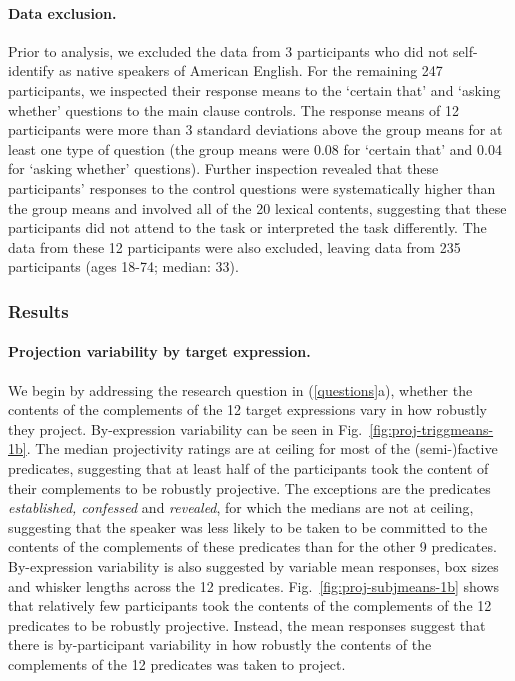 \documentclass[11pt,fleqn]{article}
\newcommand{\6}{\mbox{$[\hspace*{-.6mm}[$}}
\newcommand{\9}{\mbox{$]\hspace*{-.6mm}]$}}
\newcommand{\figref}[1]{Fig.~\ref{#1}}
\begin{document}
\paragraph{Data exclusion.} Prior to analysis, we excluded the data from 3 participants who did not self-identify as native speakers of American English. For the remaining 247 participants, we inspected their response means to the `certain that' and `asking whether' questions to the main clause controls. The response means of 12 participants were more than 3 standard deviations above the group means for at least one type of question (the group means were 0.08 for `certain that' and 0.04 for `asking whether' questions). Further inspection revealed that these participants' responses to the control questions were systematically higher than the group means and involved all of the 20 lexical contents, suggesting that these participants did not attend to the task or interpreted the task differently. The data from these 12 participants were also excluded, leaving data from 235 participants (ages 18-74; median: 33).

\subsubsection{Results}

\paragraph{Projection variability by target expression.} We begin by addressing the research question in (\ref{questions}a), whether the contents of the complements of the 12 target expressions vary in how robustly they project. By-expression variability can be seen in \figref{fig:proj-triggmeans-1b}.  The median projectivity ratings are at ceiling for most of the (semi-)factive predicates, suggesting that at least half of the participants took the content of their complements to be robustly projective. The exceptions are the predicates {\em established, confessed} and {\em revealed}, for which the medians are not at ceiling, suggesting that the speaker was less likely to be taken to be committed to the contents of the complements of these predicates than for the other 9 predicates. By-expression variability is also suggested by variable mean responses, box sizes and whisker lengths across the 12 predicates. \figref{fig:proj-subjmeans-1b} shows that relatively few participants took the contents of the complements of the 12 predicates to be robustly projective. Instead, the mean responses suggest that there is by-participant variability in how robustly the contents of the complements of the 12 predicates was taken to project.
\end{document}
